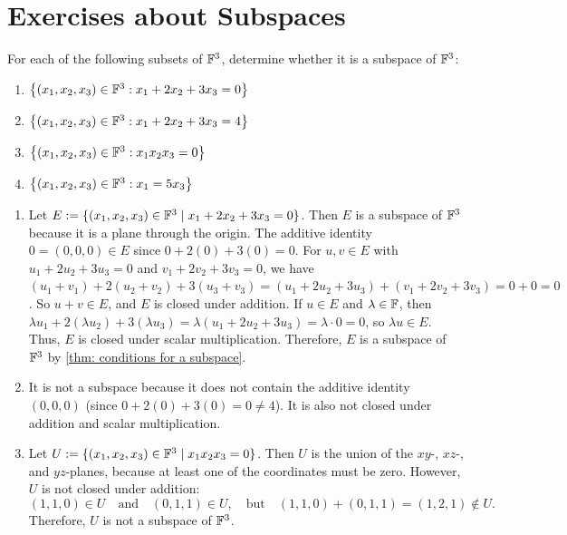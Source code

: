 \section*{Exercises about Subspaces}

\begin{xrcs}
  For each of the following subsets of $\mathbb{F}^3$, determine whether it is a subspace of $\mathbb{F}^3$:
  \begin{enumerate}
    \item $\left \{ \left(x_1, x_2, x_3 \right ) \in \mathbb{F}^3 : x_1 + 2x_2 + 3 x_3 = 0 \right \}$
    \item $\left \{ \left(x_1, x_2, x_3 \right ) \in \mathbb{F}^3 : x_1 + 2x_2 + 3 x_3 = 4 \right \}$
    \item $\left \{ \left(x_1, x_2, x_3 \right ) \in \mathbb{F}^3 : x_1 x_2 x_3 = 0 \right \}$
    \item $\left \{ \left(x_1, x_2, x_3 \right ) \in \mathbb{F}^3 : x_1 = 5x_3 \right \}$
  \end{enumerate}

  \begin{xsol}
    \begin{enumerate}
    \item Let $E := \{(x_1, x_2, x_3) \in \mathbb{F}^3 \mid x_1 + 2x_2 + 3 x_3 = 0\}$. Then $E$ is a subspace of $\mathbb{F}^3$ because it is a plane through the origin. The additive identity $0 = (0,0,0) \in E$ since $0 + 2(0) + 3(0) = 0$. For $u,v \in E$ with $u_1 + 2u_2 + 3u_3 = 0$ and $v_1 + 2v_2 + 3v_3 = 0$, we have $(u_1 + v_1) + 2(u_2 + v_2) + 3(u_3 + v_3) = (u_1 + 2u_2 + 3u_3) + (v_1 + 2v_2 + 3v_3) = 0 + 0 = 0$. So $u+v \in E$, and $E$ is closed under addition. If $u \in E$ and $\lambda \in \mathbb{F}$, then $\lambda u_1 + 2(\lambda u_2) + 3(\lambda u_3) = \lambda (u_1 + 2u_2 + 3u_3) = \lambda \cdot 0 = 0$, so $\lambda u \in E$. Thus, $E$ is closed under scalar multiplication. Therefore, $E$ is a subspace of $\mathbb{F}^3$ by \ref{thm: conditions for a subspace}.

    \item It is not a subspace because it does not contain the additive identity $(0,0,0)$ (since $0 + 2(0) + 3(0) = 0 \neq 4$). It is also not closed under addition and scalar multiplication.

    \item Let $U := \{(x_1, x_2, x_3) \in \mathbb{F}^3 \mid x_1 x_2 x_3 = 0\}$. Then $U$ is the union of the $xy$-, $xz$-, and $yz$-planes, because at least one of the coordinates must be zero. However, $U$ is not closed under addition:
    \[
    (1,1,0) \in U \quad \text{and} \quad (0,1,1) \in U, \quad \text{but} \quad (1,1,0) + (0,1,1) = (1,2,1) \notin U.
    \]
    Therefore, $U$ is not a subspace of $\mathbb{F}^3$.


\end{enumerate}
\end{xsol}
\end{xrcs}
